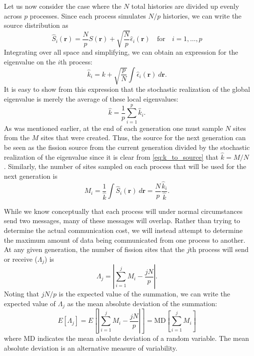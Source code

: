 Let us now consider the case where the $N$ total histories are divided up evenly
across $p$ processes. Since each process simulates $N/p$ histories, we can write
the source distribution as
\begin{equation}
  \hat{S}_i(\mathbf{r})= \frac{N}{p} S(\mathbf{r}) + \sqrt{\frac{N}{p}}
  \hat{\epsilon}_i(\mathbf{r}) \quad \text{for} \quad i = 1, \dots, p
\end{equation}
Integrating over all space and simplifying, we can obtain an expression for the
eigenvalue on the $i$th process:
\begin{equation}
  \hat{k}_i = k + \sqrt{\frac{p}{N}} \int \hat{\epsilon}_i(\mathbf{r}) \:
  d\mathbf{r}.
\end{equation}
It is easy to show from this expression that the stochastic realization of the
global eigenvalue is merely the average of these local eigenvalues:
\begin{equation}
  \label{eq:average_k_as_sum}
  \hat{k} = \frac{1}{p} \sum_{i=1}^p \hat{k}_i.
\end{equation}
As was mentioned earlier, at the end of each generation one must sample $N$
sites from the $M$ sites that were created. Thus, the source for the next
generation can be seen as the fission source from the current generation divided
by the stochastic realization of the eigenvalue since it is clear from
\eqref{eq:k_to_source} that $\hat{k} = M/N$. Similarly, the number of sites
sampled on each process that will be used for the next generation is
\begin{equation}
  \label{eq:sites_per_node}
  M_i = \frac{1}{\hat{k}} \int \hat{S}_i(\mathbf{r}) \: d\mathbf{r} =
  \frac{N}{p} \frac{\hat{k}_i}{\hat{k}}.
\end{equation}

While we know conceptually that each process will under normal circumstances
send two messages, many of these messages will overlap. Rather than trying to
determine the actual communication cost, we will instead attempt to determine
the maximum amount of data being communicated from one process to another. At
any given generation, the number of fission sites that the $j$th process will
send or receive ($\Lambda_j$) is
\begin{equation}
  \label{eq:Lambda}
  \Lambda_j = \left | \sum_{i=1}^j M_i - \frac{jN}{p} \right |.
\end{equation}
Noting that $jN/p$ is the expected value of the summation, we can write the
expected value of $\Lambda_j$ as the mean absolute deviation of the summation:
\begin{equation}
  E \left [ \Lambda_j \right ] = E \left [ \left | \sum_{i=1}^j M_i -
    \frac{jN}{p} \right | \right ] = \text{MD} \left [ \sum_{i=1}^j M_i \right ]
\end{equation}
where $\text{MD}$ indicates the mean absolute deviation of a random
variable. The mean absolute deviation is an alternative measure of variability.

